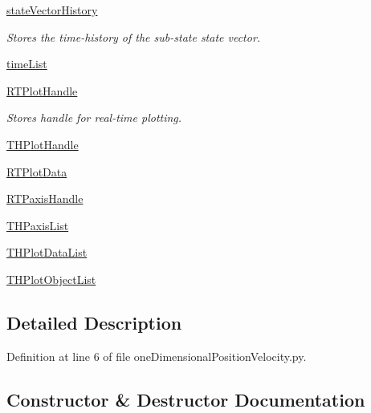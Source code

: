 \begin{DoxyCompactItemize}
\item 
\hyperlink{classmodest_1_1substates_1_1substate_1_1SubState_a38c12c9d0899bc1161f3502b584517a2}{state\+Vector\+History}
\begin{DoxyCompactList}\small\item\em Stores the time-\/history of the sub-\/state state vector. \end{DoxyCompactList}\item 
\hyperlink{classmodest_1_1substates_1_1substate_1_1SubState_a9b7a77e3b7dc14fc85962cda84e8cd58}{time\+List}
\item 
\hyperlink{classmodest_1_1substates_1_1substate_1_1SubState_a37ded775b84cea85b4dce0f1b16286c4}{R\+T\+Plot\+Handle}
\begin{DoxyCompactList}\small\item\em Stores handle for real-\/time plotting. \end{DoxyCompactList}\item 
\hyperlink{classmodest_1_1substates_1_1substate_1_1SubState_af1d5d3bbdf73cf1e78925c835f1c616e}{T\+H\+Plot\+Handle}
\item 
\hyperlink{classmodest_1_1substates_1_1substate_1_1SubState_a9fefae1facc797a1132fb61a55e9ffa1}{R\+T\+Plot\+Data}
\item 
\hyperlink{classmodest_1_1substates_1_1substate_1_1SubState_a497ccbb6658589b02568e87c6382222e}{R\+T\+Paxis\+Handle}
\item 
\hyperlink{classmodest_1_1substates_1_1substate_1_1SubState_a22c12497c37f47d54d4ea909f6423222}{T\+H\+Paxis\+List}
\item 
\hyperlink{classmodest_1_1substates_1_1substate_1_1SubState_a0e1d545f7ede186d89db38ca613633cf}{T\+H\+Plot\+Data\+List}
\item 
\hyperlink{classmodest_1_1substates_1_1substate_1_1SubState_a9659535520a27090d79be1957ecce2eb}{T\+H\+Plot\+Object\+List}
\end{DoxyCompactItemize}


\subsection{Detailed Description}


Definition at line 6 of file one\+Dimensional\+Position\+Velocity.\+py.



\subsection{Constructor \& Destructor Documentation}
